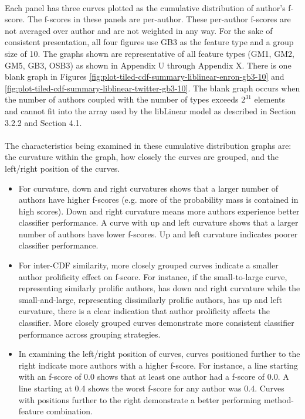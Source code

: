 	\paragraph*{}Each panel has three curves plotted as the cumulative distribution of author's f-score.  The f-scores in these panels are per-author. These per-author f-scores are not averaged over author and are not weighted in any way.  For the sake of consistent presentation, all four figures use GB3 as the feature type and a group size of 10.  The graphs shown are representative of all feature types (GM1, GM2, GM5, GB3, OSB3) as shown in Appendix U through Appendix X. There is one blank graph in Figures \ref{fig:plot-tiled-cdf-summary-liblinear-enron-gb3-10} and \ref{fig:plot-tiled-cdf-summary-liblinear-twitter-gb3-10}.  The blank graph occurs when the number of authors coupled with the number of types exceeds $2^{31}$ elements and cannot fit into the array used by the libLinear model as described in Section 3.2.2 and Section 4.1.
	
	\paragraph*{} The characteristics being examined in these cumulative distribution graphs are: the curvature within the graph, how closely the curves are grouped, and the left/right position of the curves.  
	\begin{itemize}
		\item For curvature, down and right curvatures shows that a larger number of authors have higher f-scores (e.g. more of the probability mass is contained in high scores). Down and right curvature means more authors experience better classifier performance. A curve with up and left curvature shows that a larger number of authors have lower f-scores.  Up and left curvature indicates poorer classifier performance.
		\item For inter-CDF similarity, more closely grouped curves indicate a smaller author prolificity effect on f-score.  For instance, if the small-to-large curve, representing similarly prolific authors, has down and right curvature while the small-and-large, representing dissimilarly prolific authors, has up and left curvature, there is a clear indication that author prolificity affects the classifier.  More closely grouped curves demonstrate more consistent classifier performance across grouping strategies.
		\item In examining the left/right position of curves, curves positioned further to the right indicate more authors with a higher f-score. For instance, a line starting with an f-score of 0.0 shows that at least one author had a f-score of 0.0.  A line starting at 0.4 shows the worst f-score for any author was 0.4.  Curves with positions further to the right demonstrate a better performing method-feature combination.
	\end{itemize}
	
